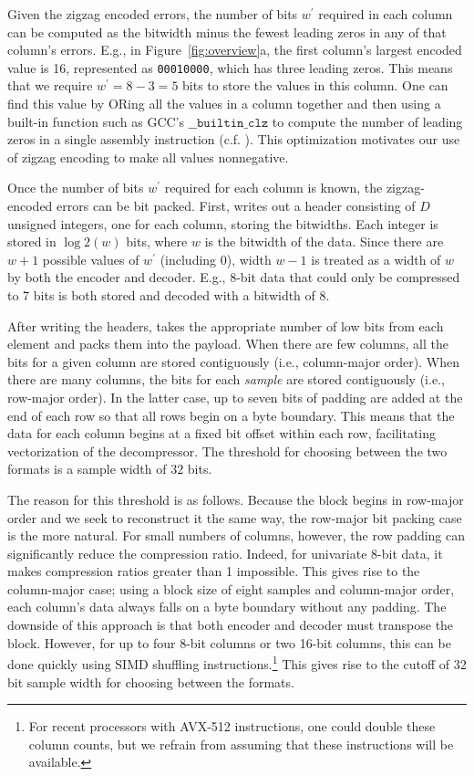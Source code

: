 Given the zigzag encoded errors, the number of bits $w^\prime$ required in each column can be computed as the bitwidth minus the fewest leading zeros in any of that column's errors. E.g., in Figure~\ref{fig:overview}a, the first column's largest encoded value is 16, represented as \texttt{00010000}, which has three leading zeros. This means that we require $w^\prime = 8 - 3 = 5$ bits to store the values in this column. One can find this value by ORing all the values in a column together and then using a built-in function such as GCC's $\texttt{\_\_builtin\_clz}$ to compute the number of leading zeros in a single assembly instruction (c.f. \cite{fastpfor}). This optimization motivates our use of zigzag encoding to make all values nonnegative.

Once the number of bits $w^\prime$ required for each column is known, the zigzag-encoded errors can be bit packed. First, \minesp writes out a header consisting of $D$ unsigned integers, one for each column, storing the bitwidths. Each integer is stored in $\log2(w)$ bits, where $w$ is the bitwidth of the data. Since there are $w+1$ possible values of $w^\prime$ (including 0), width $w-1$ is treated as a width of $w$ by both the encoder and decoder. E.g., 8-bit data that could only be compressed to 7 bits is both stored and decoded with a bitwidth of 8.

After writing the headers, \minesp takes the appropriate number of low bits from each element and packs them into the payload. When there are few columns, all the bits for a given column are stored contiguously (i.e., column-major order). When there are many columns, the bits for each \textit{sample} are stored contiguously (i.e., row-major order). In the latter case, up to seven bits of padding are added at the end of each row so that all rows begin on a byte boundary. This means that the data for each column begins at a fixed bit offset within each row, facilitating vectorization of the decompressor. The threshold for choosing between the two formats is a sample width of $32$ bits.

The reason for this threshold is as follows. Because the block begins in row-major order and we seek to reconstruct it the same way, the row-major bit packing case is the more natural. For small numbers of columns, however, the row padding can significantly reduce the compression ratio. Indeed, for univariate 8-bit data, it makes compression ratios greater than 1 impossible. This gives rise to the column-major case; using a block size of eight samples and column-major order, each column's data always falls on a byte boundary without any padding. The downside of this approach is that both encoder and decoder must transpose the block. However, for up to four 8-bit columns or two 16-bit columns, this can be done quickly using SIMD shuffling instructions.\footnote{For recent processors with AVX-512 instructions, one could double these column counts, but we refrain from assuming that these instructions will be available.} This gives rise to the cutoff of 32 bit sample width for choosing between the formats.

